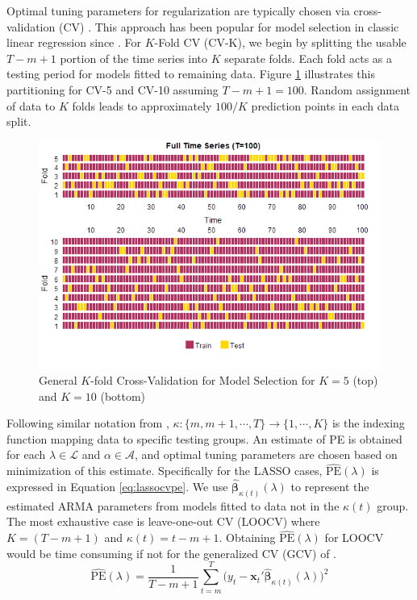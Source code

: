 Optimal tuning parameters for regularization are typically chosen via cross-validation (CV) \citep{Hastie2009a}. This approach has been popular for model selection in classic linear regression since \cite{Stone1974}. For $K$-Fold CV (CV-K), we begin by splitting the usable $T-m+1$ portion of the time series into $K$ separate folds. Each fold acts as a testing period for models fitted to remaining data. Figure \ref{fig:kcvplots} illustrates this partitioning for CV-5 and CV-10 assuming $T-m+1=100$. Random assignment of data to $K$ folds leads to approximately $100/K$ prediction points in each data split.
\begin{figure}[htbp!]
	\caption{General $K$-fold Cross-Validation for Model Selection for $K=5$ (top) and $K=10$ (bottom)}
	\center
	\label{fig:kcvplots}
	\includegraphics[scale=0.58]{kcvplots}
\end{figure}

Following similar notation from \cite{Hastie2009a}, $\kappa:\{m,m+1,\cdots,T\}\to\{1,\cdots,K\}$ is the indexing function mapping data to specific testing groups. An estimate of PE is obtained for each $\lambda \in \mathcal{L}$ and $\alpha \in \mathcal{A}$, and optimal tuning parameters are chosen based on minimization of this estimate. Specifically for the LASSO cases, $\widehat{\textrm{PE}}(\lambda)$ is expressed in Equation \ref{eq:lassocvpe}. We use $\hat{\bm{\beta}}_{\kappa(t)}(\lambda)$ to represent the estimated ARMA parameters from models fitted to data not in the $\kappa(t)$ group. The most exhaustive case is leave-one-out CV (LOOCV) where $K=(T-m+1)$ and  $\kappa(t)=t-m+1$. Obtaining $\widehat{\textrm{PE}}(\lambda)$ for LOOCV would be time consuming if not for the generalized CV (GCV) of \cite{Wahba1978}.
\begin{equation}
\label{eq:lassocvpe}
	\widehat{\textrm{PE}}(\lambda)=\frac{1}{T-m+1}\sum\limits_{t=m}^T \bigg(y_t-\bm{x}_t'\hat{\bm{\beta}}_{\kappa(t)}(\lambda)\bigg)^2
\end{equation}


